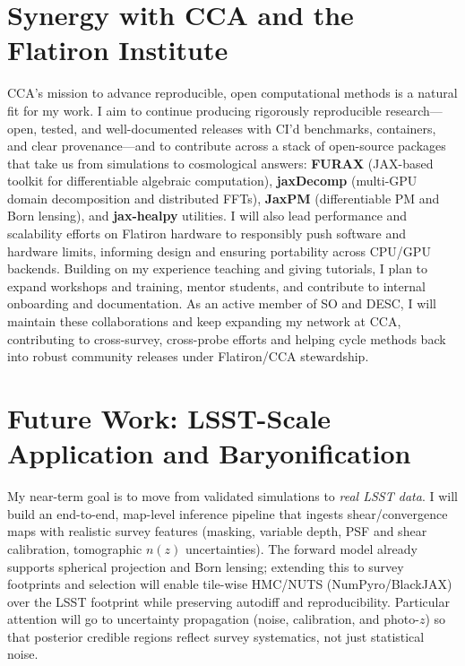 \documentclass{article}
\begin{document}
\section*{Synergy with CCA and the Flatiron Institute}
CCA’s mission to advance reproducible, open computational methods is a natural fit for my work. I aim to continue producing rigorously reproducible research—open, tested, and well-documented releases with CI’d benchmarks, containers, and clear provenance—and to contribute across a stack of open-source packages that take us from simulations to cosmological answers: \textbf{FURAX} (JAX-based toolkit for differentiable algebraic computation), \textbf{jaxDecomp} (multi-GPU domain decomposition and distributed FFTs), \textbf{JaxPM} (differentiable PM and Born lensing), and \textbf{jax-healpy} utilities. I will also lead performance and scalability efforts on Flatiron hardware to responsibly push software and hardware limits, informing design and ensuring portability across CPU/GPU backends. Building on my experience teaching and giving tutorials, I plan to expand workshops and training, mentor students, and contribute to internal onboarding and documentation. As an active member of SO and DESC, I will maintain these collaborations and keep expanding my network at CCA, contributing to cross-survey, cross-probe efforts and helping cycle methods back into robust community releases under Flatiron/CCA stewardship.


\section*{Future Work: LSST-Scale Application and Baryonification}
My near-term goal is to move from validated simulations to \emph{real LSST data}. I will build an end-to-end, map-level inference pipeline that ingests shear/convergence maps with realistic survey features (masking, variable depth, PSF and shear calibration, tomographic \(n(z)\) uncertainties). The forward model already supports spherical projection and Born lensing; extending this to survey footprints and selection will enable tile-wise HMC/NUTS (NumPyro/BlackJAX) over the LSST footprint while preserving autodiff and reproducibility. Particular attention will go to uncertainty propagation (noise, calibration, and photo-$z$) so that posterior credible regions reflect survey systematics, not just statistical noise.
\end{document}
